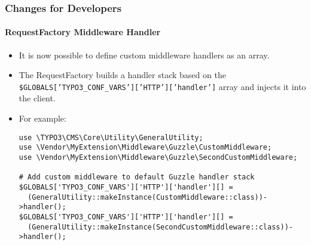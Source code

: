\begin{frame}[fragile]
	\frametitle{Changes for Developers}
	\framesubtitle{RequestFactory Middleware Handler}

	\lstset{basicstyle=\tiny\ttfamily}

	\begin{itemize}
		\item It is now possible to define custom middleware handlers as an array.
		\item The RequestFactory builds a handler stack based on the\newline
			\small
				\texttt{\$GLOBALS['TYPO3\_CONF\_VARS']['HTTP']['handler']}
			\normalsize
			array and injects it into the client.
		\item For example:

\begin{lstlisting}
use \TYPO3\CMS\Core\Utility\GeneralUtility;
use \Vendor\MyExtension\Middleware\Guzzle\CustomMiddleware;
use \Vendor\MyExtension\Middleware\Guzzle\SecondCustomMiddleware;

# Add custom middleware to default Guzzle handler stack
$GLOBALS['TYPO3_CONF_VARS']['HTTP']['handler'][] =
  (GeneralUtility::makeInstance(CustomMiddleware::class))->handler();
$GLOBALS['TYPO3_CONF_VARS']['HTTP']['handler'][] =
  (GeneralUtility::makeInstance(SecondCustomMiddleware::class))->handler();
\end{lstlisting}

	\end{itemize}

\end{frame}



